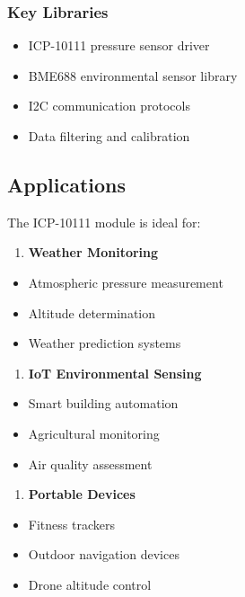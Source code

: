 \documentclass[11pt,a4paper]{article}
\begin{document}
\subsubsection{Key Libraries}
\begin{itemize}
\item ICP-10111 pressure sensor driver
\item BME688 environmental sensor library
\item I2C communication protocols
\item Data filtering and calibration
\end{itemize}

\subsection{Applications}

The ICP-10111 module is ideal for:

\begin{enumerate}
\item \textbf{Weather Monitoring}
\end{enumerate}
\begin{itemize}
\item Atmospheric pressure measurement
\item Altitude determination
\item Weather prediction systems
\end{itemize}

\begin{enumerate}
\item \textbf{IoT Environmental Sensing}
\end{enumerate}
\begin{itemize}
\item Smart building automation
\item Agricultural monitoring
\item Air quality assessment
\end{itemize}

\begin{enumerate}
\item \textbf{Portable Devices}
\end{enumerate}
\begin{itemize}
\item Fitness trackers
\item Outdoor navigation devices
\item Drone altitude control
\end{itemize}
\end{document}
